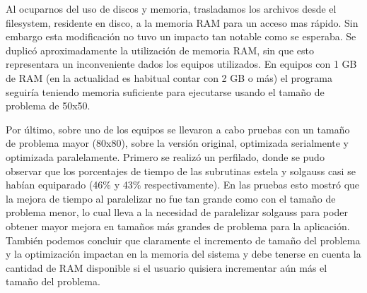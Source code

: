 Al ocuparnos del uso de discos y memoria, trasladamos los archivos desde el filesystem, residente en disco, a la memoria RAM para un acceso mas r\'apido. Sin embargo esta modificaci\'on no tuvo un impacto tan notable como se esperaba. Se duplic\'o aproximadamente la utilizaci\'on de memoria RAM, sin que esto representara un inconveniente dados los equipos utilizados. En equipos con 1 GB de RAM (en la actualidad es habitual contar con 2 GB o m\'as) el programa seguir\'ia teniendo memoria suficiente para ejecutarse usando el tama\~no de problema de 50x50. %

Por \'ultimo, sobre uno de los equipos se llevaron a cabo pruebas con un tama\~no de problema mayor (80x80), sobre la versi\'on original, optimizada serialmente y optimizada paralelamente. Primero se realiz\'o un perfilado, donde se pudo observar que los porcentajes de tiempo de las subrutinas estela y solgauss casi se hab\'ian equiparado (46\% y 43\% respectivamente). En las pruebas esto mostr\'o que la mejora de tiempo al paralelizar no fue tan grande como con el tama\~no de problema menor, lo cual lleva a la necesidad de paralelizar solgauss para poder obtener mayor mejora en tama\~nos m\'as grandes de problema para la aplicaci\'on. Tambi\'en podemos concluir que claramente el incremento de tama\~no del problema y la optimizaci\'on impactan en la memoria del sistema y debe tenerse en cuenta la cantidad de RAM disponible si el usuario quisiera incrementar a\'un m\'as el tama\~no del problema.

